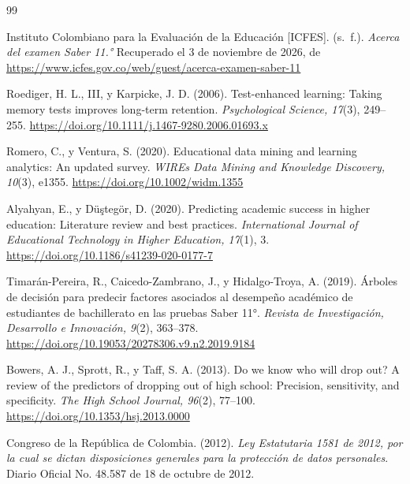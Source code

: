 \documentclass[10pt,letterpaper,twocolumn]{article}
\begin{document}
\renewcommand{\refname}{\normalfont\scshape\normalsize\centering Referencias}
\renewcommand{\bibsection}{\section*{\refname}}
{\small
\begin{thebibliography}{99}

Instituto Colombiano para la Evaluación de la Educación [ICFES]. (s.~f.). \textit{Acerca del examen Saber 11.°} Recuperado el 3 de noviembre de 2026, de \url{https://www.icfes.gov.co/web/guest/acerca-examen-saber-11}

Roediger, H. L., III, y Karpicke, J. D. (2006). Test-enhanced learning: Taking memory tests improves long-term retention. \textit{Psychological Science, 17}(3), 249--255. \url{https://doi.org/10.1111/j.1467-9280.2006.01693.x}

Romero, C., y Ventura, S. (2020). Educational data mining and learning analytics: An updated survey. \textit{WIREs Data Mining and Knowledge Discovery, 10}(3), e1355. \url{https://doi.org/10.1002/widm.1355}

Alyahyan, E., y Düştegör, D. (2020). Predicting academic success in higher education: Literature review and best practices. \textit{International Journal of Educational Technology in Higher Education, 17}(1), 3. \url{https://doi.org/10.1186/s41239-020-0177-7}

Timarán-Pereira, R., Caicedo-Zambrano, J., y Hidalgo-Troya, A. (2019). Árboles de decisión para predecir factores asociados al desempeño académico de estudiantes de bachillerato en las pruebas Saber 11°. \textit{Revista de Investigación, Desarrollo e Innovación, 9}(2), 363--378. \url{https://doi.org/10.19053/20278306.v9.n2.2019.9184}

Bowers, A. J., Sprott, R., y Taff, S. A. (2013). Do we know who will drop out? A review of the predictors of dropping out of high school: Precision, sensitivity, and specificity. \textit{The High School Journal, 96}(2), 77--100. \url{https://doi.org/10.1353/hsj.2013.0000}

Congreso de la República de Colombia. (2012). \textit{Ley Estatutaria 1581 de 2012, por la cual se dictan disposiciones generales para la protección de datos personales}. Diario Oficial No. 48.587 de 18 de octubre de 2012.


\end{thebibliography}}
\end{document}
